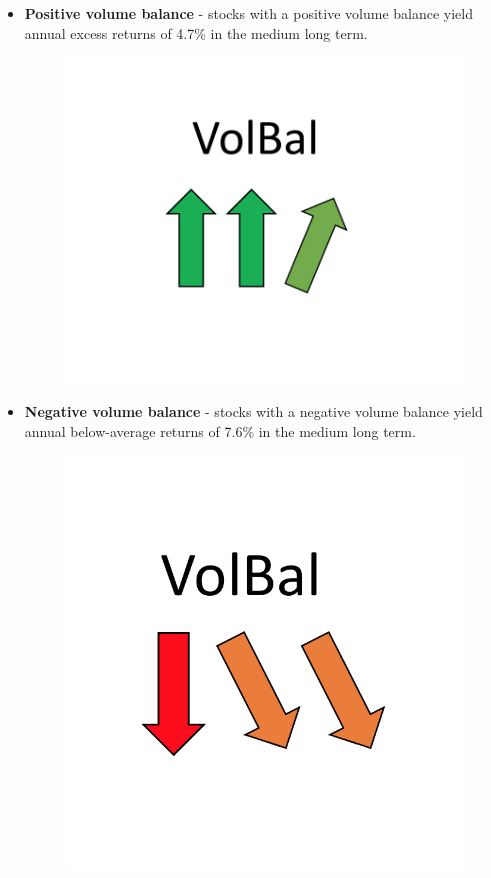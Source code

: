 \begin{itemize}
\begin{figure}[H]
\label{fig:breakdown}
\end{figure}
  \item \textbf{Positive volume balance} - stocks with a positive volume balance yield annual excess returns of 4.7\% in the medium long term.
\begin{figure}[H]
\centering
\includegraphics [scale=0.20,angle=360]{figures/volumepos.png}
\label{fig:volumepos}
\end{figure}
  \item \textbf{Negative volume balance} -  stocks with a negative volume balance yield annual below-average returns of 7.6\% in the medium long term.
\begin{figure}[H]
\centering
\includegraphics [scale=0.20,angle=360]{figures/volneg.png}

\end{figure}
\end{itemize}
